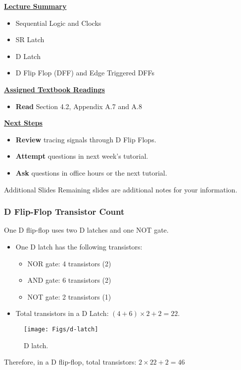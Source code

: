 \begin{frame}[fragile]
 \underline{\textbf{Lecture Summary}}
 \begin{itemize}
 \item Sequential Logic and Clocks
 \item SR Latch
 \item D Latch
 \item D Flip Flop (DFF) and Edge Triggered DFFs
 \end{itemize}
 \underline{\textbf{Assigned Textbook Readings}}
\begin{itemize}
     \item \textbf{Read} Section 4.2, Appendix A.7 and A.8
     \end{itemize}
    \underline{\textbf{Next Steps}}
    \begin{itemize}
     \item \textbf{Review} tracing signals through D Flip Flops. 
\item \textbf{Attempt} questions in next week's tutorial. 
    \item \textbf{Ask} questions in office hours or the next tutorial.
 \end{itemize}

\end{frame}

\begin{frame}{Additional Slides}
     Remaining slides are additional notes for your information.
 \end{frame}

\newpage

\begin{frame}\frametitle{D Flip-Flop Transistor Count}
One D flip-flop uses two D latches and one NOT gate. 
\begin{multicols}{2}
\begin{itemize}
    \item One D latch has the following transistors:
    \begin{itemize}
        \item NOR gate: 4 transistors (2)
        \item AND gate: 6 transistors (2)
        \item NOT gate: 2 transistors (1)
    \end{itemize}
    \item Total transistors in a D Latch: $(4+ 6) \times 2 + 2 = 22$.
\end{itemize}

\columnbreak

\begin{figure}[H]
\centering
	{\texttt{[image: Figs/d-latch]}}
\caption{D latch.}
\end{figure}

\end{multicols}
Therefore, in a D flip-flop, total transistors: $2 \times 22 + 2 = 46$
\end{frame}


